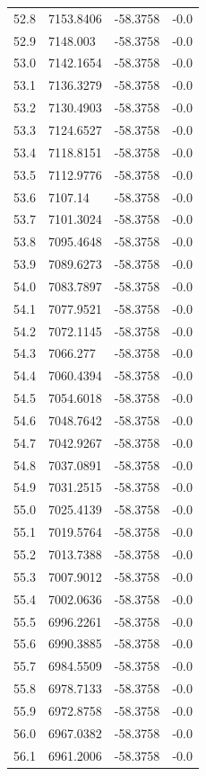 \begin{table}[H]
\begin{tabular}{llll}
52.8 & 7153.8406 & -58.3758 & -0.0 \\
52.9 & 7148.003 & -58.3758 & -0.0 \\
53.0 & 7142.1654 & -58.3758 & -0.0 \\
53.1 & 7136.3279 & -58.3758 & -0.0 \\
53.2 & 7130.4903 & -58.3758 & -0.0 \\
53.3 & 7124.6527 & -58.3758 & -0.0 \\
53.4 & 7118.8151 & -58.3758 & -0.0 \\
53.5 & 7112.9776 & -58.3758 & -0.0 \\
53.6 & 7107.14 & -58.3758 & -0.0 \\
53.7 & 7101.3024 & -58.3758 & -0.0 \\
53.8 & 7095.4648 & -58.3758 & -0.0 \\
53.9 & 7089.6273 & -58.3758 & -0.0 \\
54.0 & 7083.7897 & -58.3758 & -0.0 \\
54.1 & 7077.9521 & -58.3758 & -0.0 \\
54.2 & 7072.1145 & -58.3758 & -0.0 \\
54.3 & 7066.277 & -58.3758 & -0.0 \\
54.4 & 7060.4394 & -58.3758 & -0.0 \\
54.5 & 7054.6018 & -58.3758 & -0.0 \\
54.6 & 7048.7642 & -58.3758 & -0.0 \\
54.7 & 7042.9267 & -58.3758 & -0.0 \\
54.8 & 7037.0891 & -58.3758 & -0.0 \\
54.9 & 7031.2515 & -58.3758 & -0.0 \\
55.0 & 7025.4139 & -58.3758 & -0.0 \\
55.1 & 7019.5764 & -58.3758 & -0.0 \\
55.2 & 7013.7388 & -58.3758 & -0.0 \\
55.3 & 7007.9012 & -58.3758 & -0.0 \\
55.4 & 7002.0636 & -58.3758 & -0.0 \\
55.5 & 6996.2261 & -58.3758 & -0.0 \\
55.6 & 6990.3885 & -58.3758 & -0.0 \\
55.7 & 6984.5509 & -58.3758 & -0.0 \\
55.8 & 6978.7133 & -58.3758 & -0.0 \\
55.9 & 6972.8758 & -58.3758 & -0.0 \\
56.0 & 6967.0382 & -58.3758 & -0.0 \\
56.1 & 6961.2006 & -58.3758 & -0.0 \\

\end{tabular}
\end{table}
